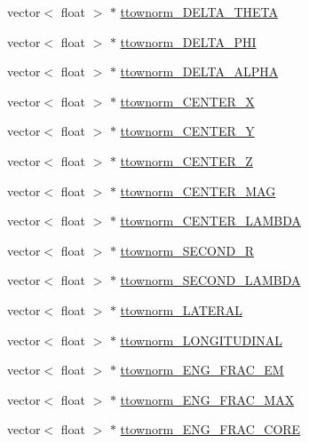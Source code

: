 \begin{DoxyCompactItemize}
\item 
vector$<$ float $>$ $\ast$ \hyperlink{classXMLWriter_ac256b71700fe85aaf628c228d2adb9e0}{ttownorm\+\_\+\+D\+E\+L\+T\+A\+\_\+\+T\+H\+E\+TA}
\item 
vector$<$ float $>$ $\ast$ \hyperlink{classXMLWriter_a2ecce9b66f6b93ed4046f0f0b8481702}{ttownorm\+\_\+\+D\+E\+L\+T\+A\+\_\+\+P\+HI}
\item 
vector$<$ float $>$ $\ast$ \hyperlink{classXMLWriter_ae4b06c67e672d67376a5d5e8ea82c07f}{ttownorm\+\_\+\+D\+E\+L\+T\+A\+\_\+\+A\+L\+P\+HA}
\item 
vector$<$ float $>$ $\ast$ \hyperlink{classXMLWriter_ae774f5427a605ced8d62fc85fa02ce80}{ttownorm\+\_\+\+C\+E\+N\+T\+E\+R\+\_\+X}
\item 
vector$<$ float $>$ $\ast$ \hyperlink{classXMLWriter_adc7a088ad3baeeeb5cba3e6580aba06d}{ttownorm\+\_\+\+C\+E\+N\+T\+E\+R\+\_\+Y}
\item 
vector$<$ float $>$ $\ast$ \hyperlink{classXMLWriter_a497e124d2a44de08e556b299cfc8a7b0}{ttownorm\+\_\+\+C\+E\+N\+T\+E\+R\+\_\+Z}
\item 
vector$<$ float $>$ $\ast$ \hyperlink{classXMLWriter_afbf2e105a1836ec176eb1d2c347734a9}{ttownorm\+\_\+\+C\+E\+N\+T\+E\+R\+\_\+\+M\+AG}
\item 
vector$<$ float $>$ $\ast$ \hyperlink{classXMLWriter_aa320f22e4d14ac5a9b8c7820ded0dd88}{ttownorm\+\_\+\+C\+E\+N\+T\+E\+R\+\_\+\+L\+A\+M\+B\+DA}
\item 
vector$<$ float $>$ $\ast$ \hyperlink{classXMLWriter_a1b7dc816ecaebd14e8ec5f0bd7c085d3}{ttownorm\+\_\+\+S\+E\+C\+O\+N\+D\+\_\+R}
\item 
vector$<$ float $>$ $\ast$ \hyperlink{classXMLWriter_a8fb1660766bc54ca8643780e5c7ddb75}{ttownorm\+\_\+\+S\+E\+C\+O\+N\+D\+\_\+\+L\+A\+M\+B\+DA}
\item 
vector$<$ float $>$ $\ast$ \hyperlink{classXMLWriter_a37431d2e8bdb194821e8134647d0037d}{ttownorm\+\_\+\+L\+A\+T\+E\+R\+AL}
\item 
vector$<$ float $>$ $\ast$ \hyperlink{classXMLWriter_a1432342ddd9410104668bbb9115b7d16}{ttownorm\+\_\+\+L\+O\+N\+G\+I\+T\+U\+D\+I\+N\+AL}
\item 
vector$<$ float $>$ $\ast$ \hyperlink{classXMLWriter_afb57da7c1722f56c96f22160eb0b5d04}{ttownorm\+\_\+\+E\+N\+G\+\_\+\+F\+R\+A\+C\+\_\+\+EM}
\item 
vector$<$ float $>$ $\ast$ \hyperlink{classXMLWriter_ae8df6603d0e65a9d13e5ef3d2ab6fc80}{ttownorm\+\_\+\+E\+N\+G\+\_\+\+F\+R\+A\+C\+\_\+\+M\+AX}
\item 
vector$<$ float $>$ $\ast$ \hyperlink{classXMLWriter_aa5e0c4c26959dbae698826bf84c74a8e}{ttownorm\+\_\+\+E\+N\+G\+\_\+\+F\+R\+A\+C\+\_\+\+C\+O\+RE}

\end{DoxyCompactItemize}
